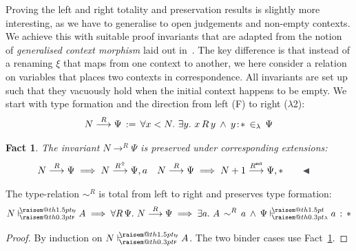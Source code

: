 \documentclass[a4paper,UKenglish]{lipics-v2016}
\makeatletter
\newcommand{\ms}{\,}
\newcommand{\mrel}[1]{\mathrel{\ms #1 \ms}}
\newcommand{\OF}{\mrel{:}}
\newcommand{\mAnd}{\mrel{\wedge}}
\newcommand{\mAll}[1]{\ensuremath{\forall} #1.\ms\ms}
\newcommand{\mEx}[1]{\ensuremath{\exists} #1.\ms\ms}
\newcommand{\eqdef}{\mrel{:=}}
\newcommand{\SysL}{$\lambda$2\xspace}
\newcommand{\ty}{\mathsf{ty}}
\newcommand{\of}{\ensuremath{\!:\!}}
\newcommand{\raisemath}[1]{\mathpalette{\raisem@th{#1}}}
\newcommand{\raisem@th}[3]{\raisebox{#1}{\ensuremath{#2#3}}}
\newcommand{\tsAnnot}[2]{\vdash\hspace{-.7em}^{\raisemath{1.5pt}{\scriptscriptstyle{#2}}}_{\raisemath{0.3pt}{\scriptscriptstyle{#1}}}} %
\newcommand{\tfF}{\tsAnnot{\mathsf{F}}{\ty}}  %
\newcommand{\istyF}[2]{\ensuremath{{#1} \mathrel{\tfF} #2}}
\newcommand{\tyL}{\tsAnnot{\lambda}{}} %
\newcommand{\typingL}[3]{\ensuremath{{#1} \mathrel{\tyL} #2 \OF #3}}
\newcommand{\inL}{\mrel{\in_{\lambda}}}
\newcommand{\tyr}{\mathrel{\sim}}
\newcommand{\Rext}[1]{\ensuremath{#1^{\mathsf{ext}}}}
\newcommand{\Rshift}[1]{\ensuremath{#1^{\Uparrow}}}
\newcommand{\tyctxrelFL}[3]{\ensuremath{#1\mathrel{\mathop{\longrightarrow}^{#2}\limits}#3}}
\newcommand{\Prp}{\ensuremath{\textrm{\textasteriskcentered}}}
\theoremstyle{plain}
\newtheorem{fact}[theorem]{Fact}
\makeatother
\begin{document}
Proving the left and right totality and preservation results is slightly more interesting, as we have to generalise to open judgements and non-empty contexts.
We achieve this with suitable proof invariants that are adapted from the notion of \emph{generalised context morphism} laid out in~\cite{KaiserEtAl:2017:sysf_pts_equiv_coq}.
The key difference is that instead of a renaming $\xi$ that maps from one context to another, we here consider a relation on variables that places two contexts in correspondence.
All invariants are set up such that they vacuously hold when the initial context happens to be empty.
We start with type formation and the direction from left (F) to right (\SysL):
\begin{align*}
  \tyctxrelFL{N}{R}{\Psi} \eqdef \mAll {x < N} \mEx y x\,R\,y \mAnd y \of \Prp \inL \Psi
\end{align*}
\begin{fact}
  \label{fac:inv-tyfl-ext}
  The invariant $\tyctxrelFL{N}{R}{\Psi}$ is preserved under corresponding extensions:
  \begin{align*}
    &\tyctxrelFL{N}{R}{\Psi} \implies \tyctxrelFL{N}{\Rshift{R}}{\Psi,a} & &\tyctxrelFL{N}{R}{\Psi} \implies \tyctxrelFL{N+1}{\Rext{R}}{\Psi,\Prp} \tag*{\qedsymbol}
  \end{align*}
\end{fact}
\begin{lemma}
  \label{lem:tyr_fl_tot_pres}
  The type-relation $\tyr^R$ is total from left to right and preserves type formation:
  \begin{align*}
    \istyF{N}{A} \implies \mAll {R\,\Psi} \tyctxrelFL{N}{R}{\Psi} \implies \mEx a A\,\tyr^R\,a \mAnd \typingL{\Psi}{a}{\Prp}
  \end{align*}
\end{lemma}
\begin{proof}
  By induction on $\istyF{N}{A}$. The two binder cases use Fact~\ref{fac:inv-tyfl-ext}.
\end{proof}
\end{document}
